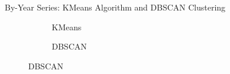 \documentclass[12pt]{beamer}
\begin{document}
        \begin{frame}{By-Year Series: KMeans Algorithm and DBSCAN Clustering}
            \begin{figure}
                \centering
                \begin{subfigure}{0.20\textwidth}
                    \caption{KMeans}
                \end{subfigure}
                \begin{subfigure}{0.20\textwidth}
                    \caption{DBSCAN}
                \end{subfigure}
            \end{figure}
        \end{frame}
\end{document}
